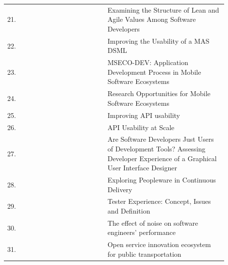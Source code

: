 \documentclass[english, 12pt, a4paper, sci, utf8, a-1b, online]{aaltothesis}
\begin{document}
\begin{center}
\begin{longtable}{p{0.05\linewidth}p{0.35\linewidth}p{0.5\linewidth}}
    21. & \textcite{fagerholm2014examining}                     & Examining the Structure of Lean and Agile Values Among Software Developers                                                                  \\
    22. & \textcite{miranda2018improving}                       & Improving the Usability of a MAS DSML                                                                                                       \\
    23. & \textcite{fontao2016mseco}                            & MSECO-DEV: Application Development Process in Mobile Software Ecosystems                                                                    \\
    24. & \textcite{fontao2015research}                         & Research Opportunities for Mobile Software Ecosystems                                                                                       \\
    25. & \textcite{myers2016improving}                         & Improving API usability                                                                                                                     \\
    26. & \textcite{macvean2016api}                             & API Usability at Scale                                                                                                                      \\
    27. & \textcite{kuusinen2016software}                       & Are Software Developers Just Users of Development Tools? Assessing Developer Experience of a Graphical User Interface Designer              \\
    28. & \textcite{karpanoja2016exploring}                     & Exploring Peopleware in Continuous Delivery                                                                                                 \\
    29. & \textcite{ekwoge2017tester}                           & Tester Experience: Concept, Issues and Definition                                                                                           \\
    30. & \textcite{romano2018effect}                           & The effect of noise on software engineers' performance                                                                                      \\
    31. & \textcite{open-service-innovation}                    & Open service innovation ecosystem for public transportation                                                                                 \\

\end{longtable}
\end{center}
\end{document}
